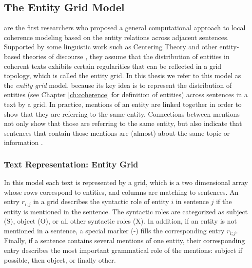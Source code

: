 \subsection{The Entity Grid Model}
\label{sec:rel-ent-grid} 

 are the first researchers who proposed a general  computational approach to local coherence modeling based on the entity relations across adjacent sentences.  
Supported by some linguistic work such as Centering Theory \cite{grosz95} and other entity-based theories of discourse \cite{prince81a}, they assume that the distribution of entities in coherent texts exhibits certain regularities that can be reflected in a grid topology, which is called the entity grid. 
In this thesis we refer to this model as the \emph{entity grid} model, because its key idea is to represent the distribution of entities (see Chapter \ref{ch:coherence} for definition of entities) across sentences in a text by a grid.   
In practice, mentions of an entity are linked together in order to show that they are referring to the same entity. 
Connections between mentions not only show that those are referring to the same entity, but also indicate that sentences that contain those mentions are (almost) about the same topic or information \cite{barzilay08}. 

\subsubsection{Text Representation: Entity Grid}

In this model each text is represented by a grid, which is a two dimensional array whose rows correspond to entities, and columns are matching to sentences.
An entry $r_{i;j}$ in a grid describes the syntactic role of entity $i$ in sentence $j$ if the entity is mentioned in the sentence. 
The syntactic roles are categorized as subject (S), object (O), or all other syntactic roles (X). 
In addition, if an entity is not mentioned in a sentence, a special marker (-) fills the corresponding entry $r_{i;j}$. 
Finally, if a sentence contains several mentions of one entity, their corresponding entry describes the most important grammatical role of the mentions: subject if possible, then object, or finally other. 

